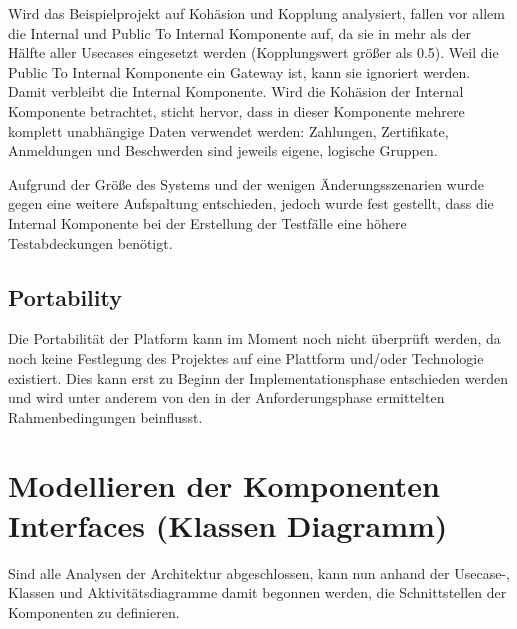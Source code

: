 Wird das Beispielprojekt auf Kohäsion und Kopplung analysiert, fallen vor allem die Internal und Public To Internal Komponente auf, da sie in mehr als der Hälfte aller Usecases eingesetzt werden (Kopplungswert größer als 0.5). Weil die Public To Internal Komponente ein Gateway ist, kann sie ignoriert werden. Damit verbleibt die Internal Komponente. Wird die Kohäsion der Internal Komponente betrachtet, sticht hervor, dass in dieser Komponente mehrere komplett unabhängige Daten verwendet werden: Zahlungen, Zertifikate, Anmeldungen und Beschwerden sind jeweils eigene, logische Gruppen.

Aufgrund der Größe des Systems und der wenigen Änderungsszenarien wurde gegen eine weitere Aufspaltung entschieden, jedoch wurde fest gestellt, dass die Internal Komponente bei der Erstellung der Testfälle eine höhere Testabdeckungen benötigt.

\subsection{Portability}
Die Portabilität der Platform kann im Moment noch nicht überprüft werden, da noch keine Festlegung des Projektes auf eine Plattform und/oder Technologie existiert. Dies kann erst zu Beginn der Implementationsphase entschieden werden und wird unter anderem von den in der Anforderungsphase ermittelten Rahmenbedingungen beinflusst.


\section{Modellieren der Komponenten Interfaces (Klassen Diagramm)}
Sind alle Analysen der Architektur abgeschlossen, kann nun anhand der Usecase-, Klassen und Aktivitätsdiagramme damit begonnen werden, die Schnittstellen der Komponenten zu definieren.
